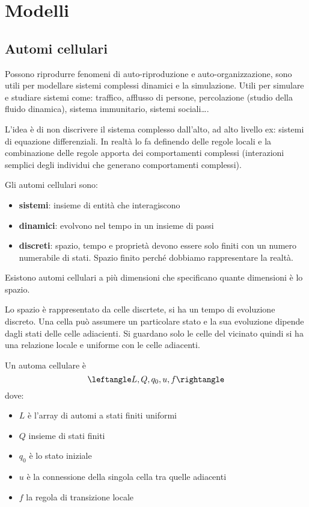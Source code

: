 \chapter{Modelli}
\section{Automi cellulari}
Possono riprodurre fenomeni di auto-riproduzione e auto-organizzazione, sono 
utili per modellare sistemi complessi dinamici e la simulazione. Utili per simulare 
e studiare sistemi come: traffico, afflusso di persone, percolazione (studio della 
fluido dinamica), sistema immunitario, sistemi sociali\dots.

L'idea è di non discrivere il sistema complesso dall'alto, ad alto livello ex: sistemi
di equazione differenziali. In realtà lo fa definendo delle regole locali e 
la combinazione delle regole apporta dei comportamenti complessi (interazioni 
semplici degli individui che generano comportamenti complessi).

Gli automi cellulari sono:
\begin{itemize}
    \item \textbf{sistemi}: insieme di entità che interagiscono
    \item \textbf{dinamici}: evolvono nel tempo in un insieme di passi
    \item \textbf{discreti}: spazio, tempo e proprietà devono essere solo finiti
    con un numero numerabile di stati. Spazio finito perché dobbiamo rappresentare
    la realtà.
\end{itemize}

Esistono automi cellulari a più dimensioni che specificano quante dimensioni è lo spazio.

Lo spazio è rappresentato da celle discrtete, si ha un tempo di evoluzione discreto.
Una cella può assumere un particolare stato e la sua evoluzione dipende dagli stati
delle celle adiacienti. Si guardano solo le celle del vicinato quindi si ha una relazione 
locale e uniforme con le celle adiacenti.

\begin{definizione}
    Un automa cellulare è
    $$\leftangle L, Q, q_0, u,f\rightangle$$
    dove:
    \begin{itemize}
        \item $L$ è l'array di automi a stati finiti uniformi
        \item $Q$ insieme di stati finiti
        \item $q_0$ è lo stato iniziale
        \item $u$ è la connessione della singola cella tra quelle adiacenti
        \item $f$ la regola di transizione locale
    \end{itemize}
\end{definizione}

